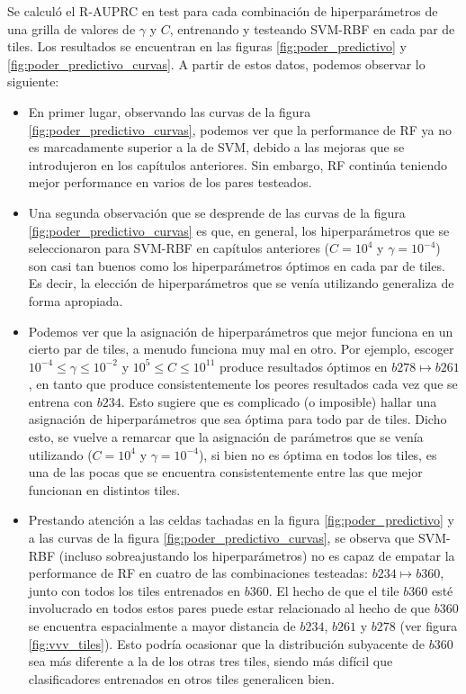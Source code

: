 Se calculó el R-AUPRC en test para cada combinación de hiperparámetros de una grilla de valores de $\gamma$ y $C$, entrenando y testeando SVM-RBF en cada par de tiles. Los resultados se encuentran en las figuras \ref{fig:poder_predictivo} y \ref{fig:poder_predictivo_curvas}. A partir de estos datos, podemos observar lo siguiente:

\begin{itemize}
\item En primer lugar, observando las curvas de la figura \ref{fig:poder_predictivo_curvas}, podemos ver que la performance de RF ya no es marcadamente superior a la de SVM, debido a las mejoras que se introdujeron en los capítulos anteriores. Sin embargo, RF continúa teniendo mejor performance en varios de los pares testeados.
\item Una segunda observación que se desprende de las curvas de la figura \ref{fig:poder_predictivo_curvas} es que, en general, los hiperparámetros que se seleccionaron para SVM-RBF en capítulos anteriores ($C=10^4$ y $\gamma=10^{-4}$) son casi tan buenos como los hiperparámetros óptimos en cada par de tiles. Es decir, la elección de hiperparámetros que se venía utilizando generaliza de forma apropiada.
\item Podemos ver que la asignación de hiperparámetros que mejor funciona en un cierto par de tiles, a menudo funciona muy mal en otro. Por ejemplo, escoger $ 10^{-4} \leq \gamma \leq 10^{-2}$ y $ 10^5 \leq C \leq 10^{11}$ produce resultados óptimos en $b278 \mapsto b261$, en tanto que produce consistentemente los peores resultados cada vez que se entrena con $b234$. Esto sugiere que es complicado (o imposible) hallar una asignación de hiperparámetros que sea óptima para todo par de tiles. Dicho esto, se vuelve a remarcar que la asignación de parámetros que se venía utilizando ($C=10^4$ y $\gamma=10^{-4}$), si bien no es óptima en todos los tiles, es una de las pocas que se encuentra consistentemente entre las que mejor funcionan en distintos tiles.
\item Prestando atención a las celdas tachadas en la figura \ref{fig:poder_predictivo} y a las curvas de la figura \ref{fig:poder_predictivo_curvas}, se observa que SVM-RBF (incluso sobreajustando los hiperparámetros) no es capaz de empatar la performance de RF en cuatro de las combinaciones testeadas: $b234 \mapsto b360$, junto con todos los tiles entrenados en $b360$. El hecho de que el tile  $b360$ esté involucrado en todos estos pares puede estar relacionado al hecho de que $b360$ se encuentra espacialmente a mayor distancia de $b234$, $b261$ y $b278$ (ver figura \ref{fig:vvv_tiles}). Esto podría ocasionar que la distribución subyacente de $b360$ sea más diferente a la de los otras tres tiles, siendo más difícil que clasificadores entrenados en otros tiles generalicen bien.
\end{itemize}


